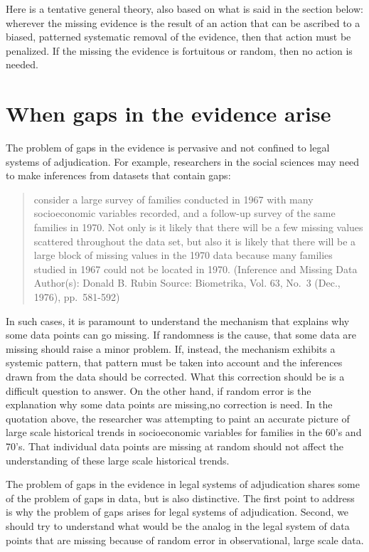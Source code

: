 \documentclass[
  10pt,
  dvipsnames,enabledeprecatedfontcommands]{scrartcl}
\begin{document}
Here is a tentative general theory, also based on what is said in the
section below: wherever the missing evidence is the result of an action
that can be ascribed to a biased, patterned systematic removal of the
evidence, then that action must be penalized. If the missing the
evidence is fortuitous or random, then no action is needed.

\hypertarget{when-gaps-in-the-evidence-arise}{%
\section{When gaps in the evidence
arise}\label{when-gaps-in-the-evidence-arise}}

The problem of gaps in the evidence is pervasive and not confined to
legal systems of adjudication. For example, researchers in the social
sciences may need to make inferences from datasets that contain gaps:

\begin{quote}
consider a large survey of families conducted in 1967 with many
socioeconomic variables recorded, and a follow-up survey of the same
families in 1970. Not only is it likely that there will be a few missing
values scattered throughout the data set, but also it is likely that
there will be a large block of missing values in the 1970 data because
many families studied in 1967 could not be located in 1970. (Inference
and Missing Data Author(s): Donald B. Rubin Source: Biometrika, Vol. 63,
No.~3 (Dec., 1976), pp.~581-592)
\end{quote}

In such cases, it is paramount to understand the mechanism that explains
why some data points can go missing. If randomness is the cause, that
some data are missing should raise a minor problem. If, instead, the
mechanism exhibits a systemic pattern, that pattern must be taken into
account and the inferences drawn from the data should be corrected. What
this correction should be is a difficult question to answer. On the
other hand, if random error is the explanation why some data points are
missing,no correction is need. In the quotation above, the researcher
was attempting to paint an accurate picture of large scale historical
trends in socioeconomic variables for families in the 60's and 70's.
That individual data points are missing at random should not affect the
understanding of these large scale historical trends.

The problem of gaps in the evidence in legal systems of adjudication
shares some of the problem of gaps in data, but is also distinctive. The
first point to address is why the problem of gaps arises for legal
systems of adjudication. Second, we should try to understand what would
be the analog in the legal system of data points that are missing
because of random error in observational, large scale data.
\end{document}
